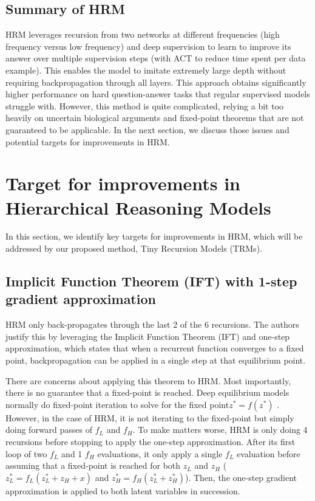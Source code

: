 \documentclass{article}
\theoremstyle{plain}
\theoremstyle{definition}
\theoremstyle{remark}
\begin{document}
\subsection{Summary of HRM}

HRM leverages recursion from two networks at different frequencies (high frequency versus low frequency) and deep supervision to learn to improve its answer over multiple supervision steps (with ACT to reduce time spent per data example). This enables the model to imitate extremely large depth without requiring backpropagation through all layers. This approach obtains significantly higher performance on hard question-answer tasks that regular supervised models struggle with. However, this method is quite complicated, relying a bit too heavily on uncertain biological arguments and fixed-point theorems that are not guaranteed to be applicable. In the next section, we discuss those issues and potential targets for improvements in HRM.

\section{Target for improvements in Hierarchical Reasoning Models}

In this section, we identify key targets for improvements in HRM, which will be addressed by our proposed method, Tiny Recursion Models (TRMs).

\subsection{Implicit Function Theorem (IFT) with 1-step gradient approximation} 

HRM only back-propagates through the last 2 of the 6 recursions. The authors justify this by leveraging the Implicit Function Theorem (IFT) and one-step approximation, which states that when a recurrent function converges to a fixed point, backpropagation can be applied in a single step at that equilibrium point. 

There are concerns about applying this theorem to HRM. Most importantly, there is no guarantee that a fixed-point is reached. Deep equilibrium models normally do fixed-point iteration to solve for the fixed point$z^* = f(z^*)$ \citep{bai2019deep}. However, in the case of HRM, it is not iterating to the fixed-point but simply doing forward passes of $f_L$ and $f_H$. To make matters worse, HRM is only doing 4 recursions before stopping to apply the one-step approximation. After its first loop of two $f_L$ and 1 $f_H$ evaluations, it only apply a single $f_L$ evaluation before assuming that a fixed-point is reached for both $z_L$ and $z_H$ ($z_L^* = f_L(z_L^*+z_H+x)$ and $z_H^* = f_H(z_L^*+z_H^*)$). Then, the one-step gradient approximation is applied to both latent variables in succession. 
\end{document}
